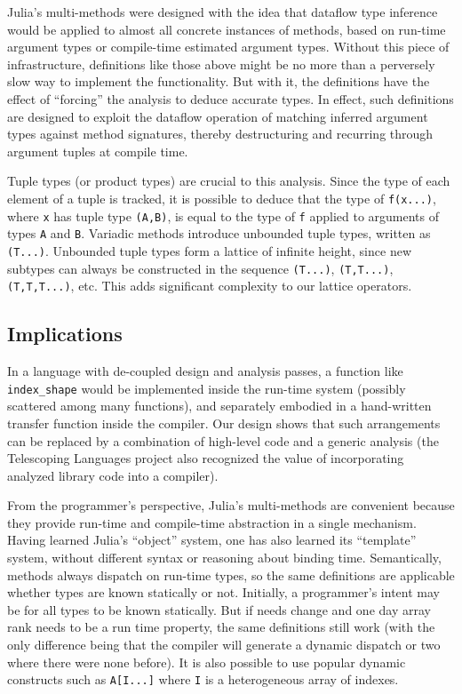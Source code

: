 \documentclass[preprint]{sigplanconf}
\newcommand{\code}[1]{\texttt{#1}}
\begin{document}
Julia's multi-methods were designed with the idea that dataflow type inference
\cite{Cousot:1977, kaplanullman}
would be applied to almost all concrete instances of methods, based on
run-time argument types or compile-time estimated argument types. Without this
piece of infrastructure, definitions like those above might be no more
than a perversely slow way to implement the functionality. But with it, the
definitions have the effect of ``forcing'' the analysis to deduce accurate
types. In effect, such definitions are designed to exploit the dataflow
operation of matching inferred argument types against method signatures,
thereby destructuring and recurring through argument tuples at compile time.

Tuple types (or product types) are crucial to this analysis. Since the type
of each element of a tuple is tracked, it is possible to deduce that
the type of \code{f(x...)}, where \code{x} has tuple type \code{(A,B)}, is
equal to the type of \code{f} applied to arguments of types \code{A} and
\code{B}. Variadic methods introduce unbounded tuple types, written as
\code{(T...)}. Unbounded tuple types form a lattice of infinite height,
since new subtypes can always be constructed in the sequence
\code{(T...)}, \code{(T,T...)}, \code{(T,T,T...)}, etc. This adds
significant complexity to our lattice operators.

\subsection{Implications}

In a language with de-coupled design and analysis passes, a function like
\code{index\_shape} would be implemented inside the run-time system
(possibly scattered among many functions), and separately embodied in
a hand-written transfer function inside the compiler. Our design shows
that such arrangements can be replaced by a combination of high-level code and
a generic analysis (the Telescoping Languages project \cite{telescoping}
also recognized the value of incorporating analyzed library code into a
compiler).

From the programmer's perspective, Julia's multi-methods are convenient
because they provide run-time and compile-time abstraction in a single
mechanism. Having learned Julia's ``object'' system, one has also learned
its ``template'' system, without different syntax or reasoning about
binding time. Semantically, methods always dispatch on run-time
types, so the same definitions are applicable whether types are known
statically or not. Initially, a programmer's intent may be for all types
to be known statically. But if needs change and one day array rank needs
to be a run time property, the same definitions still work (with the only
difference being that the compiler will generate a dynamic dispatch or
two where there were none before). It is also possible to use popular
dynamic constructs such as \code{A[I...]} where \code{I} is a heterogeneous
array of indexes.
\end{document}
